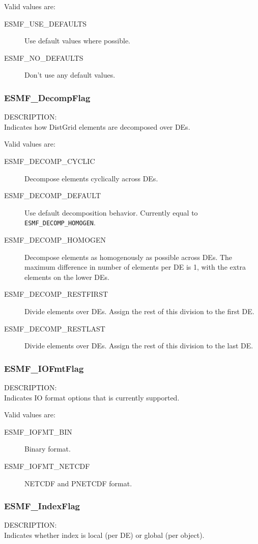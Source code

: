 Valid values are:
\begin{description}
\item [ESMF\_USE\_DEFAULTS]
      Use default values where possible.
\item [ESMF\_NO\_DEFAULTS]
      Don't use any default values.
\end{description}

\subsubsection{ESMF\_DecompFlag}
\label{opt:decompflag}
{\sf DESCRIPTION:\\}
Indicates how DistGrid elements are decomposed over DEs.

Valid values are:
\begin{description}
\item [ESMF\_DECOMP\_CYCLIC]
      Decompose elements cyclically across DEs.
\item [ESMF\_DECOMP\_DEFAULT]
      Use default decomposition behavior. Currently equal to 
      {\tt ESMF\_DECOMP\_HOMOGEN}.
\item [ESMF\_DECOMP\_HOMOGEN]
      Decompose elements as homogenously as possible across DEs. The maximum 
      difference in number of elements per DE is 1, with the extra elements on
      the lower DEs.
\item [ESMF\_DECOMP\_RESTFIRST]
      Divide elements over DEs. Assign the rest of this division to the first
      DE.
\item [ESMF\_DECOMP\_RESTLAST]
      Divide elements over DEs. Assign the rest of this division to the last DE.
\end{description}

\subsubsection{ESMF\_IOFmtFlag}
\label{opt:iofmtflag}
{\sf DESCRIPTION:\\}
Indicates IO format options that is currently supported.

Valid values are:
\begin{description}
\item [ESMF\_IOFMT\_BIN]
      Binary format.
\item [ESMF\_IOFMT\_NETCDF]
      NETCDF and PNETCDF format.
\end{description}

\subsubsection{ESMF\_IndexFlag}
\label{opt:indexflag}
{\sf DESCRIPTION:\\}
Indicates whether index is local (per DE) or global (per object).

